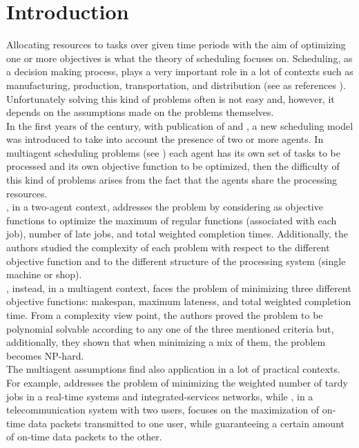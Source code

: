 \documentclass[opre,nonblindrev]{informs3} %
\begin{document}
\section{Introduction}
Allocating resources to tasks over given time periods with the aim of optimizing one or more objectives is what the theory of scheduling focuses on. Scheduling, as a decision making process, plays a very important role in a lot of contexts such as manufacturing, production, transportation, and distribution (see as references \cite{pinedo09,pinedo16}). Unfortunately solving this kind of problems often is not easy and, however, it depends on the assumptions made on the problems themselves.\\
In the first years of the century, with publication of \cite{agnetis04} and \cite{baker2003}, a new scheduling model was introduced to take into account the presence of two or more agents. In multiagent scheduling problems (see \cite{agnetis-book14}) each agent has its own set of tasks to be processed and its own objective function to be optimized, then the difficulty of this kind of problems arises from the fact that the agents share the processing resources.\\
\cite{agnetis04}, in a two-agent context, addresses the problem by considering as objective functions to optimize the maximum of regular functions (associated with each job), number of late jobs, and total weighted completion times. Additionally, the authors studied the complexity of each problem with respect to the different objective function and to the different structure of the processing system (single machine or shop).\\
\cite{baker2003}, instead, in a multiagent context, faces the problem of minimizing three different objective functions: makespan, maximum lateness, and total weighted completion time. From a complexity view point, the authors proved the problem to be polynomial solvable according to any one of the three mentioned criteria but, additionally, they shown that when minimizing a mix of them, the problem becomes NP-hard. \\
The multiagent assumptions find also application in a lot of practical contexts. For example, \cite{Peha95} addresses the problem of minimizing the weighted number of tardy jobs in a real-time systems and integrated-services networks, while \cite{Arbib04}, in a  telecommunication system with two users, focuses on the maximization of on‐time data packets transmitted to one user, while guaranteeing a certain amount of on‐time data packets to the other.\\
\end{document}

